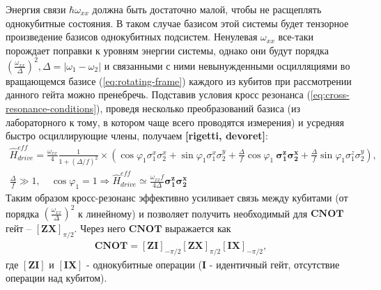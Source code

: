\documentclass[12pt, twoside]{report}
\numberwithin{equation}{section}
\numberwithin{figure}{section}
\begin{document}
Энергия связи $\hbar \omega_{xx}$ должна быть достаточно малой, чтобы не расщеплять однокубитные состояния. В таком случае базисом этой системы будет тензорное произведение базисов однокубитных подсистем. Ненулевая $\omega_{xx}$ все-таки порождает поправки к уровням энергии системы, однако они будут порядка $\left(\frac{\omega_{xx}}{\Delta} \right)^2, \Delta = \left| \omega_1 - \omega_2 \right|$ и связанными с ними невынужденными осцилляциями во вращающемся базисе (\ref{eq:rotating-frame}) каждого из кубитов при рассмотрении данного гейта можно пренебречь. Подставив условия кросс резонанса (\ref{eq:cross-resonance-conditions}), проведя несколько преобразований базиса (из лабораторного к тому, в котором чаще всего проводятся измерения)  и усредняя быстро осциллирующие члены, получаем \textbf{[rigetti, devoret]}:
\begin{gather}
\hat{H}^{eff}_{drive} = 
\frac{\omega_{xx}}{4} \frac{1}{1 + \left(\Delta / f \right)^2} \times \left( \cos \varphi_1 \sigma^x_1 \sigma^x_2 + \sin \varphi_1 \sigma^x_1 \sigma^y_2 + \frac{\Delta}{f} \cos \varphi_1 ~\mathbf{\sigma^z_1 \sigma^x_2} + \frac{\Delta}{f} \sin \varphi_1 \sigma^z_1 \sigma^y_2 \right) , \\
\frac{\Delta}{f} \gg 1, \quad \cos \varphi_1 = 1 \Rightarrow
\hat{H}^{eff}_{drive} \simeq
\frac{\omega_{xx} f}{4 \Delta} \mathbf{\sigma^z_1 \sigma^x_2}
\end{gather}
Таким образом кросс-резонанс эффективно усиливает связь между кубитами (от порядка $\left(\frac{\omega_{xx}}{\Delta} \right)^2$ к линейному) и позволяет получить необходимый для $\mathbf{CNOT}$ гейт -- $\mathbf{\left[ Z X \right]}_{\pi/2}$. Через него $\mathbf{CNOT}$ выражается как 
\begin{gather}
\mathbf{CNOT}= \mathbf{\left[ Z I \right]}_{-\pi/2} \mathbf{\left[ Z X \right]}_{\pi/2} \mathbf{\left[ I X \right]}_{-\pi/2},
\label{eq:CNOT-ZX}
\end{gather}
где $\mathbf{\left[ Z I \right]}$ и $\mathbf{\left[ I X \right]}$ - однокубитные операции ($\mathbf{I}$ - идентичный гейт, отсутствие операции над кубитом).
\end{document}
